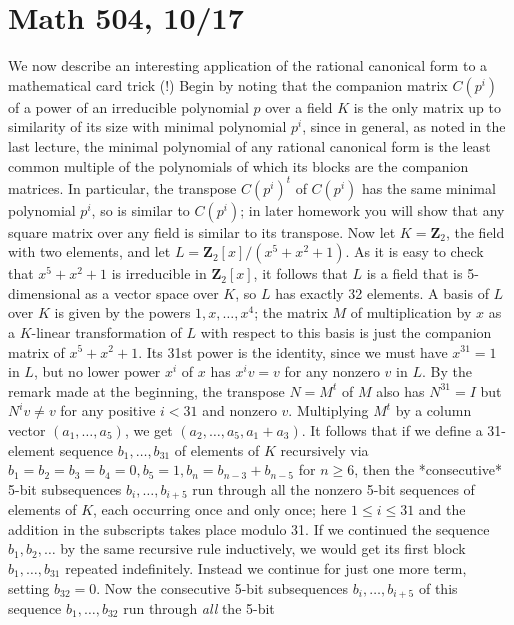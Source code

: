 \documentclass[10pt]{article}
\begin{document}
\section*{Math 504, 10/17}

We now describe an interesting application of the rational canonical
form to a mathematical card trick (!) Begin by noting that the companion
matrix $C(p^i)$ of a power of an irreducible polynomial $p$ over a field
$K$ is the only matrix up to similarity of its size with minimal
polynomial $p^i$, since in general, as noted in the last lecture, the
minimal polynomial of any rational canonical form is the least common
multiple of the polynomials of which its blocks are the companion
matrices. In particular, the transpose $C(p^i)^t$ of $C(p^i)$ has the
same minimal polynomial $p^i$, so is similar to $C(p^i)$; in later
homework you will show that any square matrix over any field is similar
to its transpose. Now let $K=\mathbf{Z}_2$, the field with two elements,
and let $L=\mathbf{Z}_2[x]/(x^5 + x^2 + 1)$. As it is easy to check that
$x^5 + x^2 + 1$ is irreducible in $\mathbf{Z}_2[x]$, it follows that $L$
is a field that is 5-dimensional as a vector space over $K$, so $L$ has
exactly 32 elements. A basis of $L$ over $K$ is given by the powers
$1,x,\ldots,x^4$; the matrix $M$ of multiplication by $x$ as a
$K$-linear transformation of $L$ with respect to this basis is just the
companion matrix of $x^5 + x^2 + 1$. Its 31st power is the identity,
since we must have $x^31 = 1$ in $L$, but no lower power $x^i$ of $x$
has $x^i v = v$ for any nonzero $v$ in $L$. By the remark made at the
beginning, the transpose $N=M^t$ of $M$ also has $N^{31} = I$ but $N^i
v\ne v$ for any positive $i<31$ and nonzero $v$. Multiplying $M^t$ by a
column vector $(a_1,\ldots,a_5)$, we get $(a_2,\ldots,a_5,a_1 + a_3)$.
It follows that if we define a 31-element sequence $b_1,\ldots,b_{31}$
of elements of $K$ recursively via $b_1=b_2=b_3=b_4=0, b_5=1, b_n =
b_{n-3}+b_{n-5}$ for $n\ge6$, then the *consecutive* 5-bit subsequences
$b_i,\ldots,b_{i+5}$ run through all the nonzero 5-bit sequences of
elements of $K$, each occurring once and only once; here $1\le i\le 31$
and the addition in the subscripts takes place modulo 31. If we
continued the sequence $b_1,b_2,\ldots$ by the same recursive rule
inductively, we would get its first block $b_1,\ldots,b_{31}$ repeated
indefinitely. Instead we continue for just one more term, setting
$b_{32}= 0$. Now the consecutive 5-bit subsequences $b_i,\ldots,b_{i+5}$
of this sequence $b_1,\ldots,b_{32}$ run through \emph{all} the 5-bit
\end{document}
